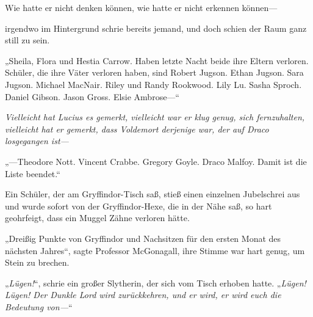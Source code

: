 Wie hatte er nicht denken können, wie hatte er nicht erkennen können—

irgendwo im Hintergrund schrie bereits jemand, und doch schien der Raum ganz still zu sein.

„Sheila, Flora und Hestia Carrow. Haben letzte Nacht beide ihre Eltern verloren. Schüler, die ihre Väter verloren haben, sind Robert Jugson. Ethan Jugson. Sara Jugson. Michael MacNair. Riley und Randy Rookwood. Lily Lu. Sasha Sproch. Daniel Gibson. Jason Gross. Elsie Ambrose—“

\emph{Vielleicht hat Lucius es gemerkt, vielleicht war er klug genug, sich fernzuhalten, vielleicht hat er gemerkt, dass Voldemort derjenige war, der auf Draco losgegangen ist—}

„—Theodore Nott. Vincent Crabbe. Gregory Goyle. Draco Malfoy. Damit ist die Liste beendet.“

Ein Schüler, der am Gryffindor-Tisch saß, stieß einen einzelnen Jubelschrei aus und wurde sofort von der Gryffindor-Hexe, die in der Nähe saß, so hart geohrfeigt, dass ein Muggel Zähne verloren hätte.

„Dreißig Punkte von Gryffindor und Nachsitzen für den ersten Monat des nächsten Jahres“, sagte Professor McGonagall, ihre Stimme war hart genug, um Stein zu brechen.

„\emph{Lügen!}“, schrie ein großer Slytherin, der sich vom Tisch erhoben hatte.
„\emph{Lügen! Lügen! Der Dunkle Lord wird zurückkehren, und er wird, er wird euch die Bedeutung von—}“

